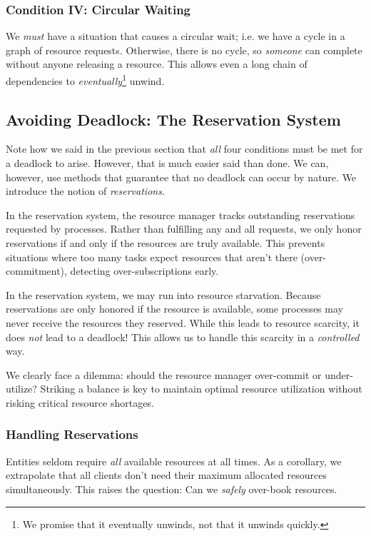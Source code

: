 \documentclass{report}
\begin{document}
\subsubsection{Condition IV: Circular Waiting}
We \textit{must} have a situation that causes a circular wait; i.e. we have a cycle in a graph of
resource requests. Otherwise, there is no cycle, so \textit{someone} can complete without anyone
releasing a resource. This allows even a long chain of dependencies to
\textit{eventually}\footnote{We promise that it eventually unwinds, not that it unwinds quickly.} unwind.


\subsection{Avoiding Deadlock: The Reservation System}
Note how we said in the previous section that \textit{all} four conditions must be met for a
deadlock to arise. However, that is much easier said than done. We can, however, use methods that
guarantee that no deadlock can occur by nature. We introduce the notion of \textit{reservations}.

In the reservation system, the resource manager tracks outstanding reservations requested by
processes. Rather than fulfilling any and all requests, we only honor reservations if and only if
the resources are truly available. This prevents situations where too many tasks expect resources
that aren't there (over-commitment), detecting over-subscriptions early.

In the reservation system, we may run into resource starvation. Because reservations are only
honored if the resource is available, some processes may never receive the resources they
reserved. While this leads to resource scarcity, it does \textit{not} lead to a deadlock! This
allows us to handle this scarcity in a \textit{controlled} way.

We clearly face a dilemma: should the resource manager over-commit or under-utilize? Striking a
balance is key to maintain optimal resource utilization without risking critical resource shortages.


\subsubsection{Handling Reservations}
Entities seldom require \textit{all} available resources at all times. As a corollary, we
extrapolate that all clients don't need their maximum allocated resources simultaneously. This
raises the question: Can we \textit{safely} over-book resources.
\end{document}
